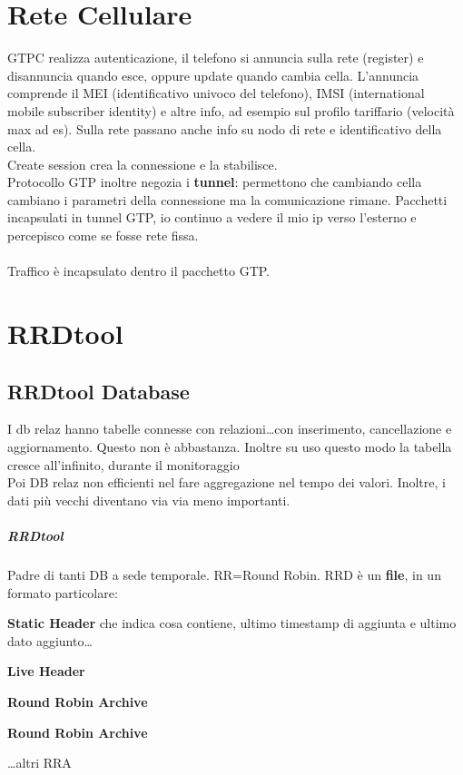 \documentclass[10pt]{book}
\begin{document}
\chapter{Rete Cellulare}
GTPC realizza autenticazione, il telefono si annuncia sulla rete (register) e disannuncia quando esce, oppure update quando cambia cella. L'annuncia comprende il MEI (identificativo univoco del telefono), IMSI (international mobile subscriber identity) e altre info, ad  esempio sul profilo tariffario (velocità max ad es). Sulla rete passano anche info su nodo di rete e identificativo della cella.\\
Create session crea la connessione e la stabilisce.\\
Protocollo GTP inoltre negozia i \textbf{tunnel}: permettono che cambiando cella cambiano i parametri della connessione ma la comunicazione rimane. Pacchetti incapsulati in tunnel GTP, io continuo a vedere il mio ip verso l'esterno e percepisco come se fosse rete fissa.\\\\
Traffico è incapsulato dentro il pacchetto GTP.
\chapter{RRDtool}
\section{RRDtool Database}
I db relaz hanno tabelle connesse con relazioni\ldots con inserimento, cancellazione e aggiornamento. Questo non è abbastanza. Inoltre su uso questo modo la tabella cresce all'infinito, durante il monitoraggio\\
Poi DB relaz non efficienti nel fare aggregazione nel tempo dei valori. Inoltre, i dati più vecchi diventano via via meno importanti.
\paragraph{RRDtool} Padre di tanti DB a sede temporale. RR=Round Robin. RRD è un \textbf{file}, in un formato particolare:
\begin{list}{}{}
	\item \textbf{Static Header} che indica cosa contiene, ultimo timestamp di aggiunta e ultimo dato aggiunto\ldots
	\item \textbf{Live Header}
	\item \textbf{Round Robin Archive}
	\item \textbf{Round Robin Archive}
	\item \ldots altri RRA
\end{list}
\end{document}

